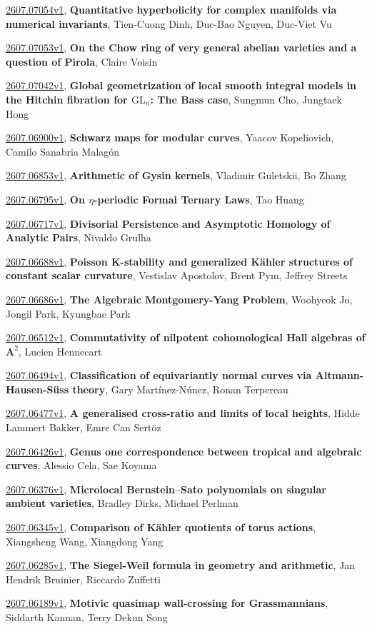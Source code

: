 \documentclass[9pt, a4paper]{article}
\theoremstyle{plain}
\theoremstyle{definition}
\theoremstyle{remark}
\newcommand{\arxiv}[3]{\href{https://arxiv.org/abs/#1}{#1}, \textbf{\textcolor{arxivblue}{#2}}, #3}
\begin{document}
\arxiv{2607.07054v1}{Quantitative hyperbolicity for complex manifolds via numerical invariants}{Tien-Cuong Dinh, Duc-Bao Nguyen, Duc-Viet Vu}

\arxiv{2607.07053v1}{On the Chow ring of very general abelian varieties and a question of Pirola}{Claire Voisin}

\arxiv{2607.07042v1}{Global geometrization of local smooth integral models in the Hitchin fibration for $\mathrm{GL}_n$: The Bass case}{Sungmun Cho, Jungtaek Hong}

\arxiv{2607.06900v1}{Schwarz maps for modular curves}{Yaacov Kopeliovich, Camilo Sanabria Malagón}

\arxiv{2607.06853v1}{Arithmetic of Gysin kernels}{Vladimir Guletskii, Bo Zhang}

\arxiv{2607.06795v1}{On $η$-periodic Formal Ternary Laws}{Tao Huang}

\arxiv{2607.06717v1}{Divisorial Persistence and Asymptotic Homology of Analytic Pairs}{Nivaldo Grulha}

\arxiv{2607.06688v1}{Poisson K-stability and generalized Kähler structures of constant scalar curvature}{Vestislav Apostolov, Brent Pym, Jeffrey Streets}

\arxiv{2607.06686v1}{The Algebraic Montgomery-Yang Problem}{Woohyeok Jo, Jongil Park, Kyungbae Park}

\arxiv{2607.06512v1}{Commutativity of nilpotent cohomological Hall algebras of $\mathbf{A}^2$}{Lucien Hennecart}

\arxiv{2607.06494v1}{Classification of equivariantly normal curves via Altmann-Hausen-Süss theory}{Gary Martínez-Núnez, Ronan Terpereau}

\arxiv{2607.06477v1}{A generalised cross-ratio and limits of local heights}{Hidde Lammert Bakker, Emre Can Sertöz}

\arxiv{2607.06426v1}{Genus one correspondence between tropical and algebraic curves}{Alessio Cela, Sae Koyama}

\arxiv{2607.06376v1}{Microlocal Bernstein--Sato polynomials on singular ambient varieties}{Bradley Dirks, Michael Perlman}

\arxiv{2607.06345v1}{Comparison of Kähler quotients of torus actions}{Xiangsheng Wang, Xiangdong Yang}

\arxiv{2607.06285v1}{The Siegel-Weil formula in geometry and arithmetic}{Jan Hendrik Bruinier, Riccardo Zuffetti}

\arxiv{2607.06189v1}{Motivic quasimap wall-crossing for Grassmannians}{Siddarth Kannan, Terry Dekun Song}
\end{document}
